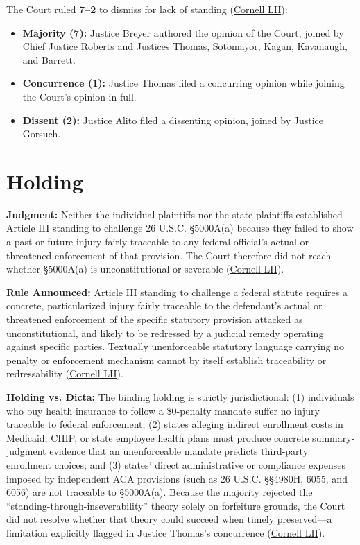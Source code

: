 \documentclass[12pt]{article}
\begin{document}
The Court ruled \textbf{7--2} to dismiss for lack of standing (\href{https://www.law.cornell.edu/supremecourt/text/19-840}{Cornell LII}):

\begin{itemize}
  \item \textbf{Majority (7):} Justice Breyer authored the opinion of the Court, joined by Chief Justice Roberts and Justices Thomas, Sotomayor, Kagan, Kavanaugh, and Barrett.
  \item \textbf{Concurrence (1):} Justice Thomas filed a concurring opinion while joining the Court's opinion in full.
  \item \textbf{Dissent (2):} Justice Alito filed a dissenting opinion, joined by Justice Gorsuch.
\end{itemize}

\section{Holding}

\textbf{Judgment:} Neither the individual plaintiffs nor the state plaintiffs established Article III standing to challenge 26 U.S.C. \S 5000A(a) because they failed to show a past or future injury fairly traceable to any federal official's actual or threatened enforcement of that provision. The Court therefore did not reach whether \S 5000A(a) is unconstitutional or severable (\href{https://www.law.cornell.edu/supremecourt/text/19-840}{Cornell LII}).

\textbf{Rule Announced:} Article III standing to challenge a federal statute requires a concrete, particularized injury fairly traceable to the defendant's actual or threatened enforcement of the specific statutory provision attacked as unconstitutional, and likely to be redressed by a judicial remedy operating against specific parties. Textually unenforceable statutory language carrying no penalty or enforcement mechanism cannot by itself establish traceability or redressability (\href{https://www.law.cornell.edu/supremecourt/text/19-840}{Cornell LII}).

\textbf{Holding vs. Dicta:} The binding holding is strictly jurisdictional: (1) individuals who buy health insurance to follow a \$0-penalty mandate suffer no injury traceable to federal enforcement; (2) states alleging indirect enrollment costs in Medicaid, CHIP, or state employee health plans must produce concrete summary-judgment evidence that an unenforceable mandate predicts third-party enrollment choices; and (3) states' direct administrative or compliance expenses imposed by independent ACA provisions (such as 26 U.S.C. \S\S 4980H, 6055, and 6056) are not traceable to \S 5000A(a). Because the majority rejected the ``standing-through-inseverability'' theory solely on forfeiture grounds, the Court did not resolve whether that theory could succeed when timely preserved---a limitation explicitly flagged in Justice Thomas's concurrence (\href{https://www.law.cornell.edu/supremecourt/text/19-840}{Cornell LII}).
\end{document}
